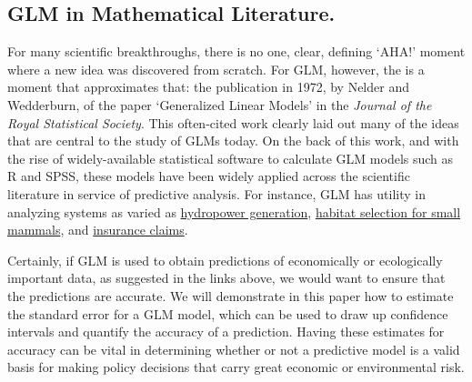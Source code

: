 \documentclass[12pt]{article}
\begin{document}

	\subsection{GLM in Mathematical Literature.}
		For many scientific breakthroughs, there is no one, clear, defining `AHA!' moment where a new idea was discovered from scratch. For
GLM, however, the is a moment that approximates that: the publication in 1972, by Nelder and Wedderburn, of the paper `Generalized Linear Models'
in the \textit{Journal of the Royal Statistical Society}.  This often-cited work clearly laid out many of the ideas that are central to the study 
of GLMs today.  On the back of this work, and with the rise of widely-available statistical software to calculate GLM models such as R and SPSS, 
these models have been widely applied across the scientific literature in service of predictive analysis.  For instance, GLM has utility in
analyzing systems as varied as 
\href{https://www.sciencedirect.com/science/article/pii/S037877961630222X}{hydropower generation}, 
\href{https://www.sciencedirect.com/science/article/pii/S1470160X17306271}{habitat selection for small mammals}, and 
\href{https://www.sciencedirect.com/science/article/pii/S0167668715303358}{insurance claims}.  



Certainly, if GLM is used to obtain predictions of economically or ecologically important data, as suggested in the links above, we would want to 
ensure that the predictions are accurate. We will demonstrate in this paper how to estimate the standard error for a GLM model, which can be 
used to draw up confidence intervals and quantify the accuracy of a prediction.  Having these estimates for accuracy can be vital in determining
whether or not a predictive model is a valid basis for making policy decisions that carry great economic or environmental risk.

\end{document}
